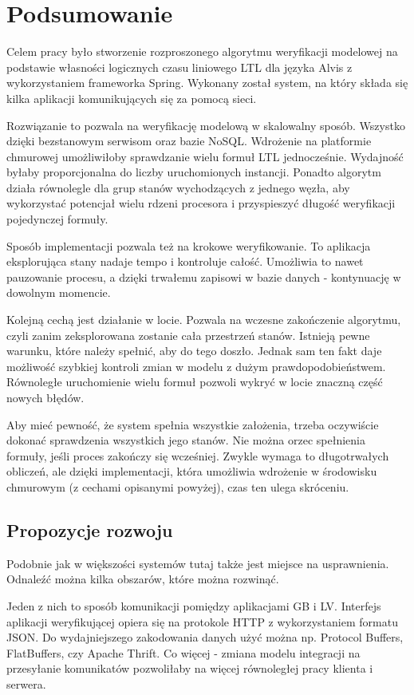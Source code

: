 \chapter{Podsumowanie}

Celem pracy było stworzenie rozproszonego algorytmu weryfikacji modelowej na podstawie własności logicznych czasu liniowego LTL dla języka Alvis z wykorzystaniem frameworka Spring.
Wykonany został system, na który składa się kilka aplikacji komunikujących się za pomocą sieci.

Rozwiązanie to pozwala na weryfikację modelową w skalowalny sposób.
Wszystko dzięki bezstanowym serwisom oraz bazie NoSQL.
Wdrożenie na platformie chmurowej umożliwiłoby sprawdzanie wielu formuł LTL jednocześnie.
Wydajność byłaby proporcjonalna do liczby uruchomionych instancji.
Ponadto algorytm działa równolegle dla grup stanów wychodzących z jednego węzła, aby wykorzystać potencjał wielu rdzeni procesora i przyspieszyć długość weryfikacji pojedynczej formuły.

Sposób implementacji pozwala też na krokowe weryfikowanie.
To aplikacja eksplorująca stany nadaje tempo i kontroluje całość.
Umożliwia to nawet pauzowanie procesu, a dzięki trwałemu zapisowi w bazie danych - kontynuację w dowolnym momencie.

Kolejną cechą jest działanie w locie.
Pozwala na wczesne zakończenie algorytmu, czyli zanim zeksplorowana zostanie cała przestrzeń stanów.
Istnieją pewne warunku, które należy spełnić, aby do tego doszło.
Jednak sam ten fakt daje możliwość szybkiej kontroli zmian w modelu z dużym prawdopodobieństwem.
Równoległe uruchomienie wielu formuł pozwoli wykryć w locie znaczną część nowych błędów.

Aby mieć pewność, że system spełnia wszystkie założenia, trzeba oczywiście dokonać sprawdzenia wszystkich jego stanów.
Nie można orzec spełnienia formuły, jeśli proces zakończy się wcześniej.
Zwykle wymaga to długotrwałych obliczeń, ale dzięki implementacji, która umożliwia wdrożenie w środowisku chmurowym (z cechami opisanymi powyżej), czas ten ulega skróceniu.


\section{Propozycje rozwoju}

Podobnie jak w większości systemów tutaj także jest miejsce na usprawnienia.
Odnaleźć można kilka obszarów, które można rozwinąć.

Jeden z nich to sposób komunikacji pomiędzy aplikacjami GB i LV.
Interfejs aplikacji weryfikującej opiera się na protokole HTTP z wykorzystaniem formatu JSON.
Do wydajniejszego zakodowania danych użyć można np. Protocol Buffers, FlatBuffers, czy Apache Thrift.
Co więcej - zmiana modelu integracji na przesyłanie komunikatów pozwoliłaby na więcej równoległej pracy klienta i serwera.

